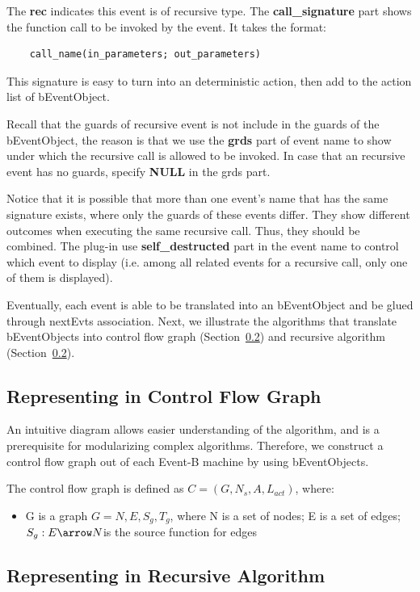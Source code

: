 \documentclass{easychair}
\begin{document}
The \textbf{rec} indicates this event is of recursive type. The \textbf{call\_signature} part shows the function call to be invoked by the event. It takes the format:
\lstset{language=[68]Algol}
\begin{lstlisting}
	call_name(in_parameters; out_parameters)
\end{lstlisting} 
This signature is easy to turn into an deterministic action, then add to the action list of bEventObject. 

Recall that the guards of recursive event is not include in the guards of the bEventObject, the reason is that we use the \textbf{grds} part of event name to show under which the recursive call is allowed to be invoked. In case that an recursive event has no guards, specify \textbf{NULL} in the grds part. 

Notice that it is possible that more than one event's name that has the same signature exists, where only the guards of these events differ. They show different outcomes when executing the same recursive call. Thus, they should be combined. The plug-in use \textbf{self\_destructed} part in the event name to control which event to display (i.e. among all related events for a recursive call, only one of them is displayed). 

Eventually, each event is able to be translated into an bEventObject and be glued through nextEvts association. Next, we illustrate the algorithms that translate bEventObjects into control flow graph (Section~\ref{}) and recursive algorithm (Section~\ref{}).


\subsection{Representing in Control Flow Graph} 
An intuitive diagram allows easier understanding of the algorithm, and is a prerequisite for modularizing complex algorithms. Therefore, we construct a control flow graph out of each Event-B machine by using bEventObjects.

The control flow graph is defined as $C = (G, N_{s}, A, L_{act})$, where:
\begin{itemize}
	\item G is a graph $G = {N, E, S_g, T_g}$, where N is a set of nodes; E is a set of edges; $S_g : E \arrow N $is the source function for edges
\end{itemize}



\subsection{Representing in Recursive Algorithm}
\end{document}
